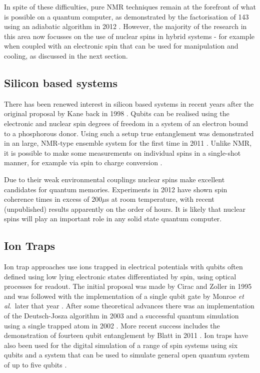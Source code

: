 In spite of these difficulties, pure NMR techniques remain at the forefront of what is possible on a quantum computer, as demonstrated by the factorisation of 143 using an adiabatic algorithm in 2012 \cite{nmr_143_factorization}.  However, the majority of the research in this area now focusses on the use of nuclear spins in hybrid systems - for example when coupled with an electronic spin that can be used for manipulation and cooling, as discussed in the next section.

\subsection{Silicon based systems}\label{silicon_based_systems}

There has been renewed interest in silicon based systems in recent years after the original proposal by Kane back in 1998 \cite{silicon_proposal_98}. Qubits can be realised using the electronic and nuclear spin degrees of freedom in a system of an electron bound to a phosphorous donor. Using such a setup true entanglement was demonstrated in an large, NMR-type ensemble system for the first time in 2011 \cite{nmr_entanglement_11}. Unlike NMR, it is possible to make some measurements on individual spins in a single-shot manner, for example via spin to charge conversion \cite{morello_spin_readout_10}.

Due to their weak environmental couplings nuclear spins make excellent candidates for quantum memories. Experiments in 2012 have shown spin coherence times in excess of 200$\mu$s \cite{silicon_qubit, silicon_seconds} at room temperature, with recent (unpublished) results apparently on the order of hours. It is likely that nuclear spins will play an important role in any solid state quantum computer.

\subsection{Ion Traps}

Ion trap approaches use ions trapped in electrical potentials with qubits often defined using low lying electronic states differentiated by spin, using optical processes for readout. The initial proposal was made by Cirac and Zoller in 1995 \cite{cirac_zoller_ion_trap_proposal_95} and was followed with the implementation of a single qubit gate by Monroe \textit{et al}.\ later that year \cite{monroe_ion_trap_gate_95}. After some theoretical advances  \cite{first_ion_trap_wineland_98} there was an implementation of the Deutsch-Josza algorithm in 2003 \cite{ion_trap_deutsch_jozsa_03} and a successful quantum simulation using a single trapped atom in 2002 \cite{ion_trap_simulator_02}. More recent success includes the demonstration of fourteen qubit entanglement by Blatt in 2011 \cite{ion_trap_14_qubits}. Ion traps have also been used for the digital simulation of a range of spin systems using six qubits \cite{ion_trap_digital_simulator} and a system that can be used to simulate general open quantum system of up to five qubits \cite{ion_trap_simulator}.

